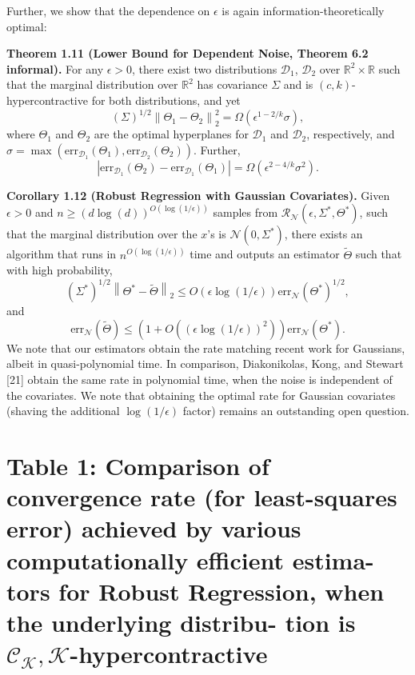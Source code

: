 \documentclass[preprint,11pt]{elsarticle}
\begin{document}
Further, we show that the dependence on $\epsilon$ is again information-theoretically optimal:

\textbf{Theorem 1.11 (Lower Bound for Dependent Noise, Theorem 6.2 informal).} For any $\epsilon > 0$, there exist two distributions $\mathcal{D}_1$, $\mathcal{D}_2$ over $\mathbb{R}^2 \times \mathbb{R}$ such that the marginal distribution over $\mathbb{R}^2$ has covariance $\Sigma$ and is $(c, k)$-hypercontractive for both distributions, and yet
\[
(\Sigma)^{1/2} \left\| \Theta_1 - \Theta_2 \right\|_2^2 = \Omega \left( \epsilon^{1 - 2/k} \sigma \right),
\]
where $\Theta_1$ and $\Theta_2$ are the optimal hyperplanes for $\mathcal{D}_1$ and $\mathcal{D}_2$, respectively, and $\sigma = \max \left( \text{err}_{\mathcal{D}_1}(\Theta_1), \text{err}_{\mathcal{D}_2}(\Theta_2) \right)$. Further,
\[
\left| \text{err}_{\mathcal{D}_1}(\Theta_2) - \text{err}_{\mathcal{D}_1}(\Theta_1) \right| = \Omega \left( \epsilon^{2 - 4/k} \sigma^2 \right).
\]

\textbf{Corollary 1.12 (Robust Regression with Gaussian Covariates).} Given $\epsilon > 0$ and $n \geq (d \log(d))^{O(\log(1/\epsilon))}$ samples from $\mathcal{R}_{\mathcal{N}}(\epsilon, \Sigma^\ast, \Theta^\ast)$, such that the marginal distribution over the $x$'s is $\mathcal{N}(0, \Sigma^\ast)$, there exists an algorithm that runs in $n^{O(\log(1/\epsilon))}$ time and outputs an estimator $\tilde{\Theta}$ such that with high probability,
\[
(\Sigma^\ast)^{1/2} \left\| \Theta^\ast - \tilde{\Theta} \right\|_2 \leq O \left( \epsilon \log(1/\epsilon) \right) \text{err}_{\mathcal{N}}(\Theta^\ast)^{1/2},
\]
and
\[
\text{err}_{\mathcal{N}}(\tilde{\Theta}) \leq \left( 1 + O \left( \left( \epsilon \log(1/\epsilon) \right)^2 \right) \right) \text{err}_{\mathcal{N}}(\Theta^\ast).
\]
We note that our estimators obtain the rate matching recent work for Gaussians, albeit in quasi-polynomial time. In comparison, Diakonikolas, Kong, and Stewart [21] obtain the same rate in polynomial time, when the noise is independent of the covariates. We note that obtaining the optimal rate for Gaussian covariates (shaving the additional $\log(1/\epsilon)$ factor) remains an outstanding open question.

\section*{\textbf{Table 1: Comparison of convergence rate (for least-squares
error) achieved by various computationally efficient estima-
tors for Robust Regression, when the underlying distribu-
tion is $\mathcal{C_K,K} $-hypercontractive}}
 
\end{document}
